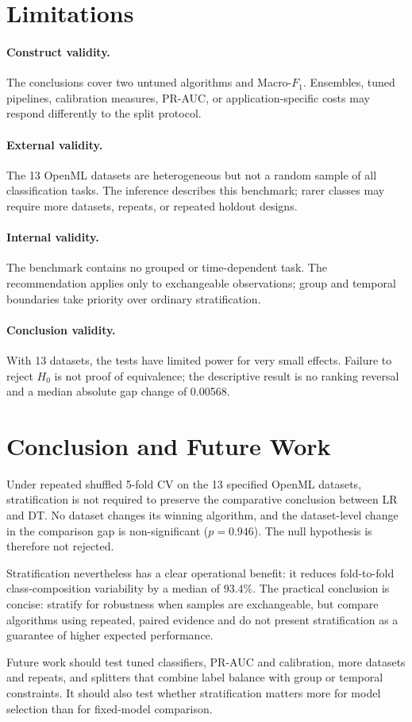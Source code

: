 \documentclass[twoside,11pt]{article}
\newcommand{\macrof}{Macro-$F_1$}
\begin{document}
\section{Limitations}
\paragraph{Construct validity.}
The conclusions cover two untuned algorithms and \macrof. Ensembles, tuned pipelines, calibration measures, PR-AUC, or application-specific costs may respond differently to the split protocol.

\paragraph{External validity.}
The 13 OpenML datasets are heterogeneous but not a random sample of all classification tasks. The inference describes this benchmark; rarer classes may require more datasets, repeats, or repeated holdout designs.

\paragraph{Internal validity.}
The benchmark contains no grouped or time-dependent task. The recommendation applies only to exchangeable observations; group and temporal boundaries take priority over ordinary stratification.

\paragraph{Conclusion validity.}
With 13 datasets, the tests have limited power for very small effects. Failure to reject $H_0$ is not proof of equivalence; the descriptive result is no ranking reversal and a median absolute gap change of 0.00568.

\section{Conclusion and Future Work}
Under repeated shuffled 5-fold CV on the 13 specified OpenML datasets, stratification is not required to preserve the comparative conclusion between LR and DT. No dataset changes its winning algorithm, and the dataset-level change in the comparison gap is non-significant ($p=0.946$). The null hypothesis is therefore not rejected.

Stratification nevertheless has a clear operational benefit: it reduces fold-to-fold class-composition variability by a median of 93.4\%. The practical conclusion is concise: stratify for robustness when samples are exchangeable, but compare algorithms using repeated, paired evidence and do not present stratification as a guarantee of higher expected performance.

Future work should test tuned classifiers, PR-AUC and calibration, more datasets and repeats, and splitters that combine label balance with group or temporal constraints. It should also test whether stratification matters more for model selection than for fixed-model comparison.

\vskip 0.2in

\end{document}
